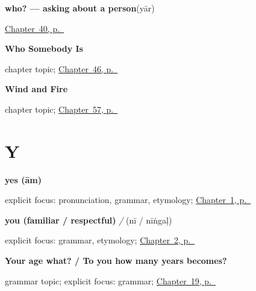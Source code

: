 \noindent\begin{minipage}[t]{\linewidth}
\raggedright
\textbf{who? — asking about a person}\enspace\emph{}\enspace(yār)\par
\footnotesize \hyperref[ch:ta-pointing-and-asking]{Chapter~40, p.~\pageref*{ch:ta-pointing-and-asking}}
\end{minipage}\par\smallskip

\noindent\begin{minipage}[t]{\linewidth}
\raggedright
\textbf{Who Somebody Is}\par
\footnotesize chapter topic; \hyperref[ch:ta-roles]{Chapter~46, p.~\pageref*{ch:ta-roles}}
\end{minipage}\par\smallskip

\noindent\begin{minipage}[t]{\linewidth}
\raggedright
\textbf{Wind and Fire}\par
\footnotesize chapter topic; \hyperref[ch:ta-wind-and-fire]{Chapter~57, p.~\pageref*{ch:ta-wind-and-fire}}
\end{minipage}\par\smallskip

\section*{Y}

\noindent\begin{minipage}[t]{\linewidth}
\raggedright
\textbf{yes (ām)}\enspace\emph{}\par
\footnotesize explicit focus: pronunciation, grammar, etymology; \hyperref[ch:greetings]{Chapter~1, p.~\pageref*{ch:greetings}}
\end{minipage}\par\smallskip

\noindent\begin{minipage}[t]{\linewidth}
\raggedright
\textbf{you (familiar / respectful)}\enspace\emph{ / }\enspace(nī / nīṅgaḷ)\par
\footnotesize explicit focus: grammar, etymology; \hyperref[ch:introductions]{Chapter~2, p.~\pageref*{ch:introductions}}
\end{minipage}\par\smallskip

\noindent\begin{minipage}[t]{\linewidth}
\raggedright
\textbf{Your age what? / To you how many years becomes?}\par
\footnotesize grammar topic; explicit focus: grammar; \hyperref[ch:ta-asking-age]{Chapter~19, p.~\pageref*{ch:ta-asking-age}}
\end{minipage}\par\smallskip

